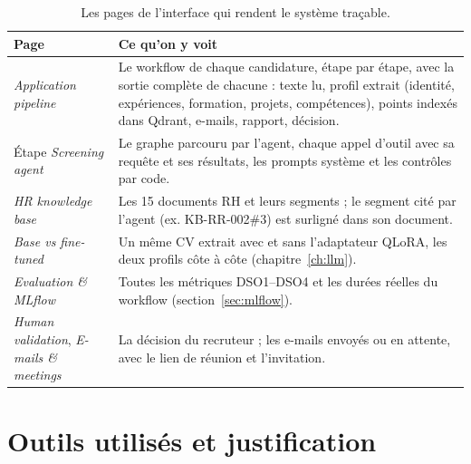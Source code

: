 \documentclass[11pt,a4paper]{report}
\newcommand{\kb}[1]{\textsf{#1}}
\begin{document}
\begin{table}[ht]
\centering\small
\begin{tabularx}{\textwidth}{L{4.2cm}Y}
\toprule
\textbf{Page} & \textbf{Ce qu'on y voit}\\
\midrule
\emph{Application pipeline} & Le workflow de chaque candidature, étape par étape, avec la sortie complète de chacune : texte lu, profil extrait (identité, expériences, formation, projets, compétences), points indexés dans Qdrant, e-mails, rapport, décision.\\
Étape \emph{Screening agent} & Le graphe parcouru par l'agent, chaque appel d'outil avec sa requête et ses résultats, les prompts système et les contrôles par code.\\
\emph{HR knowledge base} & Les 15 documents RH et leurs segments ; le segment cité par l'agent (ex. \kb{KB-RR-002\#3}) est surligné dans son document.\\
\emph{Base vs fine-tuned} & Un même CV extrait avec et sans l'adaptateur QLoRA, les deux profils côte à côte (chapitre~\ref{ch:llm}).\\
\emph{Evaluation \& MLflow} & Toutes les métriques DSO1--DSO4 et les durées réelles du workflow (section~\ref{sec:mlflow}).\\
\emph{Human validation}, \emph{E-mails \& meetings} & La décision du recruteur ; les e-mails envoyés ou en attente, avec le lien de réunion et l'invitation.\\
\bottomrule
\end{tabularx}
\caption{Les pages de l'interface qui rendent le système traçable.}
\label{tab:ui}
\end{table}

\chapter{Outils utilisés et justification}
\end{document}
